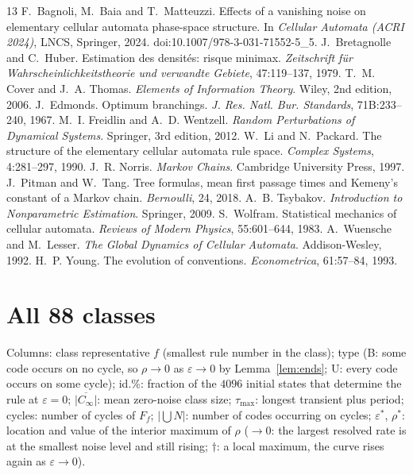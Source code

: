 \documentclass[11pt,a4paper]{article}
\theoremstyle{remark}
\newcommand{\eps}{\varepsilon}
\begin{document}
\begin{thebibliography}{13}\small
{} F.~Bagnoli, M.~Baia and T.~Matteuzzi. Effects of a vanishing noise on elementary cellular automata phase-space structure. In \emph{Cellular Automata (ACRI 2024)}, LNCS, Springer, 2024. doi:10.1007/978-3-031-71552-5\_5.
 J.~Bretagnolle and C.~Huber. Estimation des densit\'es: risque minimax. \emph{Zeitschrift f\"ur Wahrscheinlichkeitstheorie und verwandte Gebiete}, 47:119--137, 1979.
 T.~M. Cover and J.~A. Thomas. \emph{Elements of Information Theory}. Wiley, 2nd edition, 2006.
 J.~Edmonds. Optimum branchings. \emph{J. Res. Natl. Bur. Standards}, 71B:233--240, 1967.
 M.~I. Freidlin and A.~D. Wentzell. \emph{Random Perturbations of Dynamical Systems}. Springer, 3rd edition, 2012.
 W.~Li and N.~Packard. The structure of the elementary cellular automata rule space. \emph{Complex Systems}, 4:281--297, 1990.
 J.~R. Norris. \emph{Markov Chains}. Cambridge University Press, 1997.
 J.~Pitman and W.~Tang. Tree formulas, mean first passage times and Kemeny's constant of a Markov chain. \emph{Bernoulli}, 24, 2018.
 A.~B. Tsybakov. \emph{Introduction to Nonparametric Estimation}. Springer, 2009.
 S.~Wolfram. Statistical mechanics of cellular automata. \emph{Reviews of Modern Physics}, 55:601--644, 1983.
 A.~Wuensche and M.~Lesser. \emph{The Global Dynamics of Cellular Automata}. Addison-Wesley, 1992.
 H.~P. Young. The evolution of conventions. \emph{Econometrica}, 61:57--84, 1993.
\end{thebibliography}

\clearpage
\appendix
\section{All 88 classes}\label{app:table}
\footnotesize\setlength{\tabcolsep}{2.6pt}
Columns: class representative $f$ (smallest rule number in the class); type (B: some code occurs on no cycle, so $\rho\to0$ as $\eps\to0$ by Lemma~\ref{lem:ends}; U: every code occurs on some cycle); id.\%: fraction of the $4096$ initial states that determine the rule at $\eps=0$; $\overline{|C_\infty|}$: mean zero-noise class size; $\tau_{\max}$: longest transient plus period; cycles: number of cycles of $F_f$; $|\bigcup N|$: number of codes occurring on cycles; $\eps^*$, $\rho^*$: location and value of the interior maximum of $\rho$ ($\to0$: the largest resolved rate is at the smallest noise level and still rising; $\dagger$: a local maximum, the curve rises again as $\eps\to0$).

\medskip
{\scriptsize}
\end{document}
